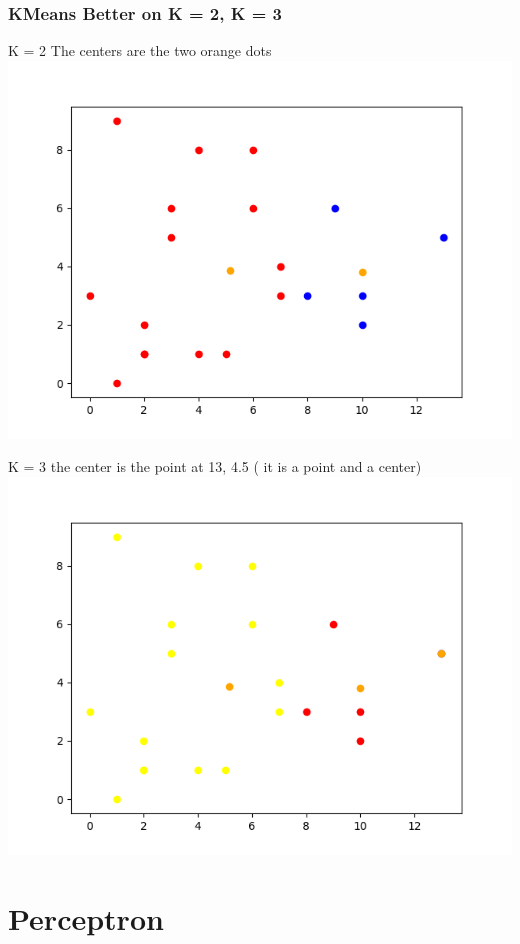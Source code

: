 \documentclass{article}
\begin{document}
	\subsubsection{KMeans Better on K = 2, K = 3}
	\begin{center}
		K = 2 The centers are the two orange dots
		\includegraphics[scale=.8]{KMeans_better_K=2.png}
	\end{center}
	\begin{center}
		K = 3 	the center is the point at 13, 4.5 ( it is a point and a center)
		\includegraphics[scale=.8]{KMeans_better_K=3.png}
	\end{center}
	
	\section{Perceptron}
\end{document}
